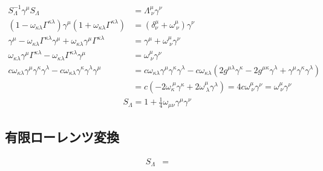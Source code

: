 \documentclass[uplatex,dvipdfmx,a4paper,11pt]{jlreq}
\numberwithin{equation}{section}
\theoremstyle{definition}
\begin{document}
\begin{align}
  S_\Lambda^{-1}\gamma^\mu S_\Lambda                                                                                           & = \Lambda^\mu_{\ \nu}\gamma^\nu                                                                                                                                                               \\
  (1 - \omega_{\kappa\lambda}\Gamma^{\kappa\lambda})\gamma^\mu(1 + \omega_{\kappa\lambda}\Gamma^{\kappa\lambda})               & = (\delta^\mu_\nu + \omega^\mu_{\ \nu})\gamma^\nu                                                                                                                                             \\
  \gamma^\mu - \omega_{\kappa\lambda}\Gamma^{\kappa\lambda}\gamma^\mu + \omega_{\kappa\lambda}\gamma^\mu\Gamma^{\kappa\lambda} & = \gamma^\mu + \omega^\mu_{\ \nu}\gamma^\nu                                                                                                                                                   \\
  \omega_{\kappa\lambda}\gamma^\mu\Gamma^{\kappa\lambda} - \omega_{\kappa\lambda}\Gamma^{\kappa\lambda}\gamma^\mu              & = \omega^\mu_{\ \nu}\gamma^\nu                                                                                                                                                                \\
  c\omega_{\kappa\lambda}\gamma^\mu\gamma^\kappa\gamma^\lambda - c\omega_{\kappa\lambda}\gamma^\kappa\gamma^\lambda\gamma^\mu  & = c\omega_{\kappa\lambda}\gamma^\mu\gamma^\kappa\gamma^\lambda - c\omega_{\kappa\lambda}(2g^{\mu\lambda}\gamma^\kappa - 2g^{\mu\kappa}\gamma^\lambda + \gamma^\mu\gamma^\kappa\gamma^\lambda) \\
                                                                                                                               & = c(-2\omega_{\kappa}^{\ \mu}\gamma^\kappa + 2\omega^\mu_{\ \lambda}\gamma^\lambda) = 4c\omega_{\ \nu}^{\mu}\gamma^\nu = \omega^\mu_{\ \nu}\gamma^\nu
\end{align}
\begin{align}
  S_\Lambda = 1 + \frac{1}{4}\omega_{\mu\nu}\gamma^\mu\gamma^\nu
\end{align}



\subsection{有限ローレンツ変換}
\begin{align}
  S_\Lambda & =
\end{align}
\end{document}
